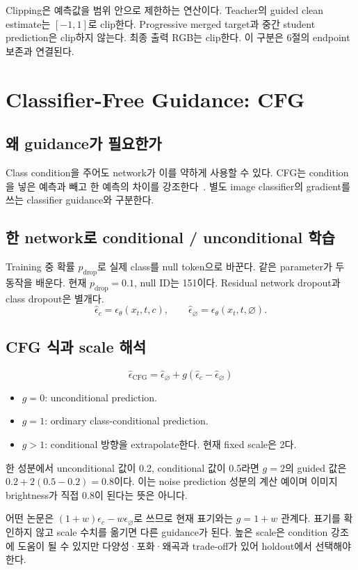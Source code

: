 \documentclass[11pt,a4paper]{article}
\begin{document}
Clipping은 예측값을 범위 안으로 제한하는 연산이다. Teacher의 guided clean estimate는 $[-1,1]$로 clip한다. Progressive merged target과 중간 student prediction은 clip하지 않는다. 최종 출력 RGB는 clip한다. 이 구분은 6절의 endpoint 보존과 연결된다.

\section{Classifier-Free Guidance: CFG}
\subsection{왜 guidance가 필요한가}
Class condition을 주어도 network가 이를 약하게 사용할 수 있다. CFG는 condition을 넣은 예측과 빼고 한 예측의 차이를 강조한다~\cite{cfg}. 별도 image classifier의 gradient를 쓰는 classifier guidance와 구분한다.

\subsection{한 network로 conditional / unconditional 학습}
Training 중 확률 $p_{\mathrm{drop}}$로 실제 class를 null token으로 바꾼다. 같은 parameter가 두 동작을 배운다. 현재 $p_{\mathrm{drop}}=0.1$, null ID는 151이다. Residual network dropout과 class dropout은 별개다.
\[
\hat\epsilon_c=\epsilon_\theta(x_t,t,c),\qquad
\hat\epsilon_\varnothing=\epsilon_\theta(x_t,t,\varnothing).
\]

\subsection{CFG 식과 scale 해석}
\begin{equation}
\boxed{\hat\epsilon_{\mathrm{CFG}}=\hat\epsilon_\varnothing+g(\hat\epsilon_c-\hat\epsilon_\varnothing)}
\end{equation}
\begin{itemize}
\item $g=0$: unconditional prediction.
\item $g=1$: ordinary class-conditional prediction.
\item $g>1$: conditional 방향을 extrapolate한다. 현재 fixed scale은 2다.
\end{itemize}
한 성분에서 unconditional 값이 0.2, conditional 값이 0.5라면 $g=2$의 guided 값은 $0.2+2(0.5-0.2)=0.8$이다. 이는 noise prediction 성분의 계산 예이며 이미지 brightness가 직접 0.8이 된다는 뜻은 아니다.

어떤 논문은 $(1+w)\epsilon_c-w\epsilon_\varnothing$로 쓰므로 현재 표기와는 $g=1+w$ 관계다. 표기를 확인하지 않고 scale 수치를 옮기면 다른 guidance가 된다. 높은 scale은 condition 강조에 도움이 될 수 있지만 다양성·포화·왜곡과 trade-off가 있어 holdout에서 선택해야 한다.
\end{document}
